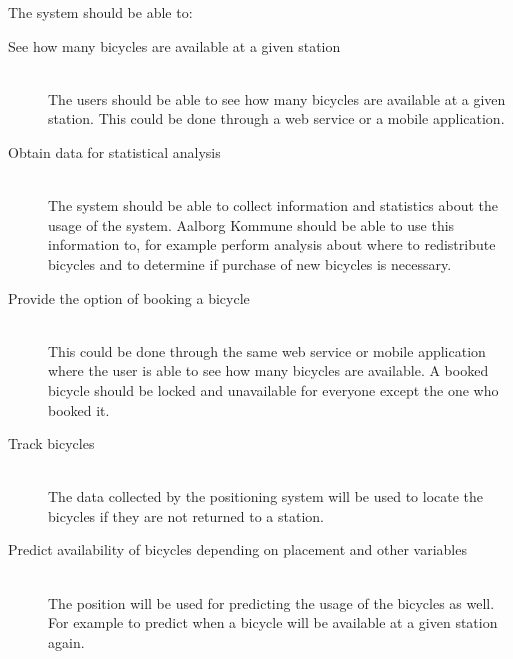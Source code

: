 The system should be able to:
\begin{description}
\item[See how many bicycles are available at a given station] \hfill \\
The users should be able to see how many bicycles are available at a given station.
This could be done through a web service or a mobile application.
\item[Obtain data for statistical analysis] \hfill \\
The system should be able to collect information and statistics about the usage of the system.
Aalborg Kommune should be able to use this information to, for example perform analysis about where to redistribute bicycles and to determine if purchase of new bicycles is necessary.
\item[Provide the option of booking a bicycle] \hfill \\
This could be done through the same web service or mobile application where the user is able to see how many bicycles are available.
A booked bicycle should be locked and unavailable for everyone except the one who booked it.
\item[Track bicycles] \hfill \\
The data collected by the positioning system will be used to locate the bicycles if they are not returned to a station.
\item[Predict availability of bicycles depending on placement and other variables] \hfill \\
The position will be used for predicting the usage of the bicycles as well. 
For example to predict when a bicycle will be available at a given station again.
\end{description}

